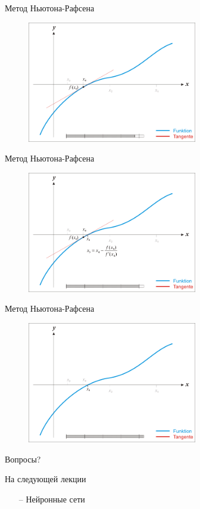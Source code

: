 \documentclass[10pt]{beamer}
\begin{document}
\begin{frame}{Метод Ньютона-Рафсена}
	\begin{figure}[htbp]
	  \includegraphics[height=150pt, keepaspectratio = true]{images/newton-15}   
	\end{figure}
\end{frame}

\begin{frame}{Метод Ньютона-Рафсена}
	\begin{figure}[htbp]
	  \includegraphics[height=150pt, keepaspectratio = true]{images/newton-16}   
	\end{figure}
\end{frame}

\begin{frame}{Метод Ньютона-Рафсена}
	\begin{figure}[htbp]
	  \includegraphics[height=150pt, keepaspectratio = true]{images/newton-17}   
	\end{figure}
\end{frame}

\begin{frame}[standout]
  Вопросы?
\end{frame}

\appendix

\begin{frame}{На следующей лекции}
	\begin{itemize}
    	\item[--] Нейронные сети
	\end{itemize}
\end{frame}
\end{document}
